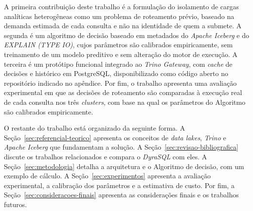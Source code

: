 A primeira contribuição deste trabalho é a formulação do isolamento de cargas analíticas heterogêneas como um problema de roteamento prévio, baseado na demanda estimada de cada consulta e não na identidade de quem a submete. A segunda é um algoritmo de decisão baseado em metadados do \textit{Apache Iceberg} e do \textit{EXPLAIN (TYPE IO)}, cujos parâmetros são calibrados empiricamente, sem treinamento de um modelo preditivo e sem alteração do motor de execução. A terceira é um protótipo funcional integrado ao \textit{Trino Gateway}, com \textit{cache} de decisões e histórico em PostgreSQL, disponibilizado como código aberto no repositório indicado no apêndice. Por fim, o trabalho apresenta uma avaliação experimental em que as decisões de roteamento são comparadas à execução real de cada consulta nos três \textit{clusters}, com base na qual os parâmetros do Algoritmo são calibrados empiricamente.

O restante do trabalho está organizado da seguinte forma. A Seção~\ref{sec:referencial-teorico} apresenta os conceitos de \textit{data lakes}, \textit{Trino} e \textit{Apache Iceberg} que fundamentam a solução. A Seção~\ref{sec:revisao-bibliografica} discute os trabalhos relacionados e compara o \textit{DyraSQL} com eles. A Seção~\ref{sec:metodologia} detalha a arquitetura e o Algoritmo de decisão, com um exemplo de cálculo. A Seção~\ref{sec:experimentos} apresenta a avaliação experimental, a calibração dos parâmetros e a estimativa de custo. Por fim, a Seção~\ref{sec:consideracoes-finais} apresenta as considerações finais e os trabalhos futuros.
